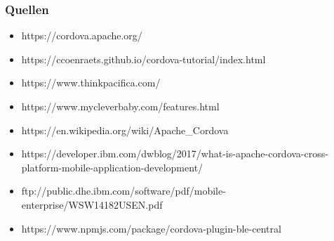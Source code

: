 \documentclass[xcolor=dvipsnames]{beamer}
\begin{document}
\begin{frame}\frametitle{Quellen}
\begin{itemize}
	\item https://cordova.apache.org/
	\item https://ccoenraets.github.io/cordova-tutorial/index.html
	\item https://www.thinkpacifica.com/
	\item https://www.mycleverbaby.com/features.html
	\item https://en.wikipedia.org/wiki/Apache\_Cordova
	\item https://developer.ibm.com/dwblog/2017/what-is-apache-cordova-cross-platform-mobile-application-development/
	\item ftp://public.dhe.ibm.com/software/pdf/mobile-enterprise/WSW14182USEN.pdf
	\item https://www.npmjs.com/package/cordova-plugin-ble-central
\end{itemize}
\end{frame}
\end{document}
